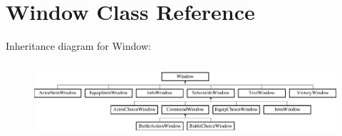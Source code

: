 \hypertarget{classWindow}{\section{Window Class Reference}
\label{classWindow}
}
Inheritance diagram for Window\-:\begin{figure}[H]
\begin{center}
\leavevmode
\includegraphics[height=2.765432cm]{classWindow}
\end{center}
\end{figure}
